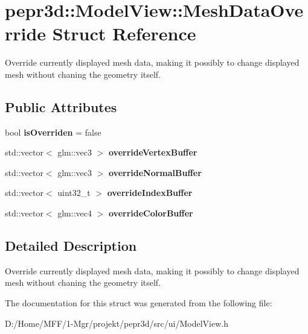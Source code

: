 \hypertarget{structpepr3d_1_1_model_view_1_1_mesh_data_override}{}\section{pepr3d\+::Model\+View\+::Mesh\+Data\+Override Struct Reference}
\label{structpepr3d_1_1_model_view_1_1_mesh_data_override}


Override currently displayed mesh data, making it possibly to change displayed mesh without chaning the geometry itself.  


\subsection*{Public Attributes}
\begin{DoxyCompactItemize}
\item 
\mbox{\label{structpepr3d_1_1_model_view_1_1_mesh_data_override_abaedf122b334bd216d91980c5c1ac2a5}} 
bool {\bfseries is\+Overriden} = false
\item 
\mbox{\label{structpepr3d_1_1_model_view_1_1_mesh_data_override_ad35f91e5ef93f5ece38ddcf2a78367bd}} 
std\+::vector$<$ glm\+::vec3 $>$ {\bfseries override\+Vertex\+Buffer}
\item 
\mbox{\label{structpepr3d_1_1_model_view_1_1_mesh_data_override_a65665c663093ae39c760f97106b83898}} 
std\+::vector$<$ glm\+::vec3 $>$ {\bfseries override\+Normal\+Buffer}
\item 
\mbox{\label{structpepr3d_1_1_model_view_1_1_mesh_data_override_a6dba6601caa77be66ee8977d61c91f5a}} 
std\+::vector$<$ uint32\+\_\+t $>$ {\bfseries override\+Index\+Buffer}
\item 
\mbox{\label{structpepr3d_1_1_model_view_1_1_mesh_data_override_a0c68ae2c99757525d953c4e744fd6499}} 
std\+::vector$<$ glm\+::vec4 $>$ {\bfseries override\+Color\+Buffer}
\end{DoxyCompactItemize}


\subsection{Detailed Description}
Override currently displayed mesh data, making it possibly to change displayed mesh without chaning the geometry itself. 

The documentation for this struct was generated from the following file\+:\begin{DoxyCompactItemize}
\item 
D\+:/\+Home/\+M\+F\+F/1-\/\+Mgr/projekt/pepr3d/src/ui/Model\+View.\+h\end{DoxyCompactItemize}
